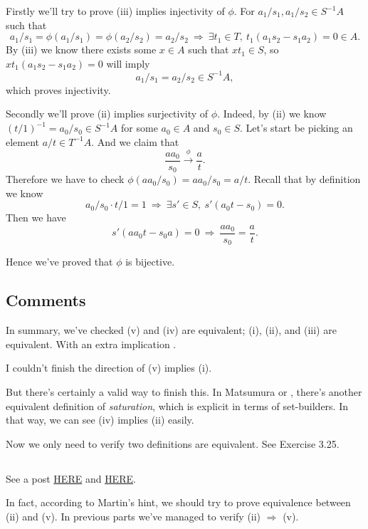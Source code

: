 Firstly we'll try to prove (iii) implies injectivity of $\phi$. For $a_1/s_1,a_1/s_2\in S^{-1}A$ such that \[a_1/s_1=\phi(a_1/s_1)=\phi(a_2/s_2)=a_2/s_2 ~\Rightarrow~ \exists t_1\in T,~ t_1(a_1s_2-s_1a_2)=0\in A.\]
By (iii) we know there exists some $x\in A$ such that $xt_1\in S$, so $xt_1(a_1s_2-s_1a_2)=0$ will imply \[a_1/s_1=a_2/s_2\in S^{-1}A,\] which proves injectivity.

Secondly we'll prove (ii) implies surjectivity of $\phi$.
Indeed, by (ii) we know $(t/1)^{-1}=a_0/s_0\in S^{-1}A$ for some $a_0\in A$ and $s_0\in S$. Let's start be picking an element $a/t\in T^{-1}A$. And we claim that \[\frac{aa_0}{s_0}\overset{\phi}{\rightarrow}\frac{a}{t}.\] Therefore we have to check $\phi(aa_0/s_0)=aa_0/s_0=a/t$. Recall that by definition we know \[a_0/s_0\cdot t/1=1 ~\Rightarrow~ \exists s'\in S,~ s'(a_0t-s_0)=0.\] Then we have \[s'(aa_0t-s_0a)=0 ~\Rightarrow~ \frac{aa_0}{s_0}=\frac{a}{t}.\]

Hence we've proved that $\phi$ is bijective. 

\subsection{Comments}

In summary, we've checked (v) and (iv) are equivalent; (i), (ii), and (iii) are equivalent. With an extra implication . 

I couldn't finish the direction of (v) implies (i). 

But there's certainly a valid way to finish this. In Matsumura \cite{matsumura1989commutative} or \cite{altman}, there's another equivalent definition of \textit{saturation}, which is explicit in terms of set-builders. In that way, we can see (iv) implies (ii) easily. 

Now we only need to verify two definitions are equivalent. See \cite{altman} Exercise 3.25.

\subsection{}

See a post \href{http://math_research.uct.ac.za/marques/US/AMCh3forSophiesAGSeminar.pdf}{HERE} and \href{https://math.stackexchange.com/questions/308292/s-t-be-multiplicatively-closed-sets-in-the-ring-r-such-that-s-subseteq-t}{HERE}.

In fact, according to Martin's hint, we should try to prove equivalence between (ii) and (v). In previous parts we've managed to verify (ii) $\Rightarrow$ (v).

